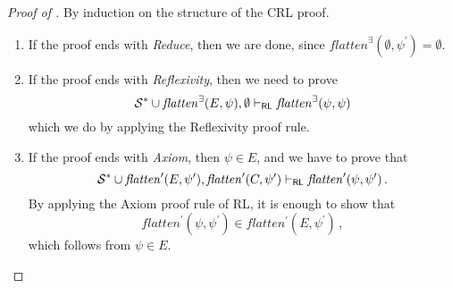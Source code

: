 \begin{proof}[Proof of ]
By induction on the structure of the CRL proof.
\begin{enumerate}
    \item If the proof ends with \emph{Reduce}, then we are done, since $\mathit{flatten}^\exists(\emptyset, \psi^\prime) = \emptyset$.
    
    \item If the proof ends with \emph{Reflexivity}, then we need to prove
    \begin{equation*}
        \mathcal{S}^* \cup \mathit{flatten}^\exists(E, \psi), \emptyset \vdash_{\mathsf{RL}}
          \mathit{flatten}^\exists(\psi, \psi) 
    \end{equation*}
    which we do by applying the Reflexivity proof rule.
    
    \item If the proof ends with \emph{Axiom}, then $\psi \in E$,
          and we have to prove that
          \begin{equation*}
            \mathcal{S}^* \cup \mathit{flatten}^\prime(E, \psi^\prime), \mathit{flatten}^\prime(C, \psi^\prime) \vdash_{\mathsf{RL}}
            \mathit{flatten}^\prime(\psi, \psi^\prime)               \, .
          \end{equation*}
          By applying the Axiom proof rule of RL, it is enough to show that
          \begin{equation*}
              \mathit{flatten}^\prime(\psi, \psi^\prime) \in \mathit{flatten^\prime}(E, \psi^\prime) \, ,
          \end{equation*}
          which follows from $\psi \in E$.
          

\end{enumerate}
\end{proof}
